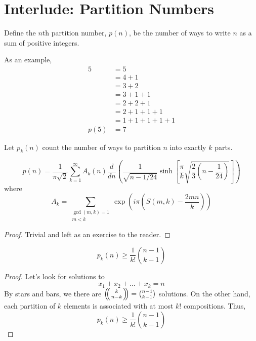 \label{27-0408}
\section{Interlude: Partition Numbers}

\begin{definition}
    Define the $n$th partition number, $p(n)$, be the number of ways to write $n$ as a
sum of positive integers.
\end{definition}

As an example,
\begin{align*}
    5 &= 5 \\
&= 4 + 1 \\
&= 3 + 2 \\
&= 3 + 1 + 1\\
&= 2 + 2 + 1\\
&= 2 + 1 + 1 + 1\\
&= 1 + 1 + 1 + 1 + 1\\
p(5) &= 7
\end{align*}
\begin{definition}
    Let $p_k(n)$ count the number of ways to partition $n$ into exactly $k$ parts. 
\end{definition}
\begin{theorem}
    \[
        p(n) = \frac 1{\pi \sqrt 2} \sum_{k=1}^\infty A_k(n) \frac d{dn} 
        \left(\frac 1 {\sqrt{n - 1/24}} \sinh \left[\frac \pi k \sqrt{\frac 23 \left( n - \frac 1 {24} \right)} \right] \right) 
    \]
    where 
    \[
        A_k = \sum_{\substack{\gcd(m, k) = 1 \\ m < k}} \exp \left( i \pi \left( S(m, k) - \frac{2mn}k \right) \right)
    \]
\end{theorem}
\begin{proof}
    Trivial and left as an exercise to the reader.
\end{proof}

\begin{theorem}
    \[
        p_k(n) \geq \frac 1{k!} \binom{n-1}{k-1}
    \]
\end{theorem}
\begin{proof}
    Let's look for solutions to 
    \[ x_1 + x_2 + \dots + x_k = n \]
    By stars and bars, we there are $\snb k {n-k} = \binom{n-1}{k-1}$ solutions. 
On the other hand, each partition of $k$ elements is associated with at most $k!$
compositions. Thus, 
\[ p_k(n) \geq \frac 1{k!} \binom{n-1}{k-1}\]
\end{proof}

